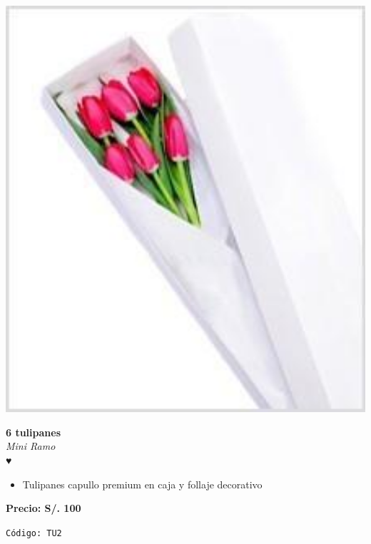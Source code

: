 \documentclass[12pt]{article}
\begin{document}
\begin{minipage}{0.35\textwidth}
    \includegraphics[width=1.0\textwidth]{imagenes_extraidas/image_2_4}
\end{minipage}
\hspace{1cm}
\begin{minipage}{0.6\textwidth}
    \textcolor[HTML]{FF8C00}{\textbf{\huge 6 tulipanes }}\\
    {\textit{Mini Ramo}} \\
    \textcolor[HTML]{FF8C00}{\Huge ♥} \\
    \vspace{0.5cm}
    \begin{itemize}
        \item Tulipanes capullo premium en caja y follaje decorativo
    \end{itemize}
\end{minipage}
\vspace{0.3cm}
\begin{center}
   \textbf{\Large Precio: \textcolor[HTML]{228B22}{S/. 100 }}
\end{center}
\begin{center}
    \textcolor[HTML]{191970}{\texttt{Código: TU2}}
\end{center}
\end{document}
